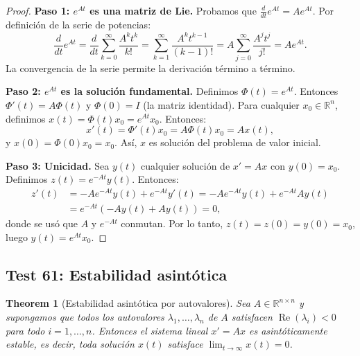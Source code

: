 \documentclass[11pt,a4paper]{article}
\theoremstyle{plain}
\newtheorem{theorem}{Theorem}[section]
\theoremstyle{definition}
\begin{document}
\begin{proof}
\textbf{Paso 1: $e^{At}$ es una matriz de Lie.} Probamos que $\frac{d}{dt} e^{At} = A e^{At}$. Por definición de la serie de potencias:
\[
\frac{d}{dt} e^{At} = \frac{d}{dt} \sum_{k=0}^{\infty} \frac{A^k t^k}{k!} = \sum_{k=1}^{\infty} \frac{A^k t^{k-1}}{(k-1)!} = A \sum_{j=0}^{\infty} \frac{A^j t^j}{j!} = A e^{At}.
\]
La convergencia de la serie permite la derivación término a término.

\textbf{Paso 2: $e^{At}$ es la solución fundamental.} Definimos $\Phi(t) = e^{At}$. Entonces $\Phi'(t) = A \Phi(t)$ y $\Phi(0) = I$ (la matriz identidad). Para cualquier $x_0 \in \mathbb{R}^n$, definimos $x(t) = \Phi(t) x_0 = e^{At} x_0$. Entonces:
\[
x'(t) = \Phi'(t) x_0 = A \Phi(t) x_0 = A x(t),
\]
y $x(0) = \Phi(0) x_0 = x_0$. Así, $x$ es solución del problema de valor inicial.

\textbf{Paso 3: Unicidad.} Sea $y(t)$ cualquier solución de $x' = Ax$ con $y(0) = x_0$. Definimos $z(t) = e^{-At} y(t)$. Entonces:
\begin{align*}
z'(t) &= -A e^{-At} y(t) + e^{-At} y'(t) = -A e^{-At} y(t) + e^{-At} A y(t) \\
&= e^{-At}(-A y(t) + A y(t)) = 0,
\end{align*}
donde se usó que $A$ y $e^{-At}$ conmutan. Por lo tanto, $z(t) = z(0) = y(0) = x_0$, luego $y(t) = e^{At} x_0$.
\end{proof}

\subsection{Test 61: Estabilidad asintótica}
\begin{theorem}[Estabilidad asintótica por autovalores]
Sea $A \in \mathbb{R}^{n \times n}$ y supongamos que todos los autovalores $\lambda_1, \ldots, \lambda_n$ de $A$ satisfacen $\operatorname{Re}(\lambda_i) < 0$ para todo $i = 1, \ldots, n$. Entonces el sistema lineal $x' = Ax$ es asintóticamente estable, es decir, toda solución $x(t)$ satisface $\lim_{t \to \infty} x(t) = 0$.
\end{theorem}
\end{document}
